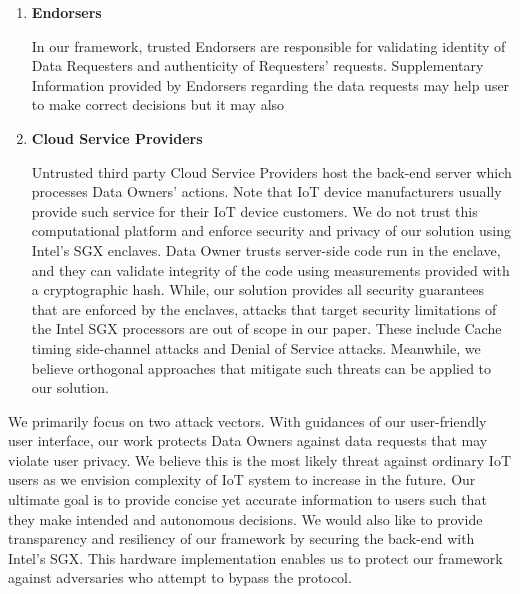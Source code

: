 \begin{enumerate}
\item \textbf {Endorsers}

In our framework, trusted Endorsers are responsible for validating identity of Data Requesters and authenticity of Requesters' requests. Supplementary Information provided by Endorsers regarding the data requests may help user to make correct decisions but it may also 

\item \textbf {Cloud Service Providers}

Untrusted third party Cloud Service Providers host the back-end server which processes Data Owners' actions. Note that IoT device manufacturers usually provide such service for their IoT device customers. We do not trust this computational platform and enforce security and privacy of our solution using Intel's SGX enclaves. Data Owner trusts server-side code run in the enclave, and they can validate integrity of the code using measurements provided with a cryptographic hash. While, our solution provides all security guarantees that are enforced by the enclaves, attacks that target security limitations of the Intel SGX processors are out of scope in our paper. These include Cache timing side-channel attacks \cite{leaky} and Denial of Service attacks. Meanwhile, we believe orthogonal approaches \cite{mengjia, raccoon} that mitigate such threats can be applied to our solution. 

\end{enumerate}

We primarily focus on two attack vectors. With guidances of our user-friendly user interface, our work protects Data Owners against data requests that may violate user privacy. We believe this is the most likely threat against ordinary IoT users as we envision complexity of IoT system to increase in the future. Our ultimate goal is to provide concise yet accurate information to users such that they make intended and autonomous decisions. We would also like to provide transparency and resiliency of our framework by securing the back-end with Intel's SGX. This hardware implementation enables us to protect our framework against adversaries who attempt to bypass the protocol.